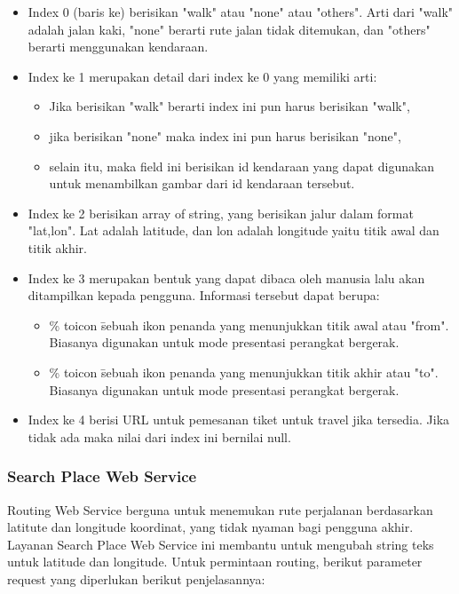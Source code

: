 \begin{itemize}
	\item Index 0 (baris ke) berisikan "walk" atau "none" atau "others". Arti dari "walk" adalah jalan kaki, "none" berarti rute jalan tidak ditemukan, dan "others" berarti menggunakan kendaraan.
	\item Index ke 1 merupakan detail dari index ke 0 yang memiliki arti:
	\begin{itemize}
		\item Jika berisikan "walk" berarti index ini pun harus berisikan "walk",
		\item jika berisikan "none" maka index ini pun harus berisikan "none",
		\item selain itu, maka field ini berisikan id kendaraan yang dapat digunakan untuk menambilkan gambar dari id kendaraan tersebut.
	\end{itemize}
	\item Index ke 2 berisikan array of string, yang berisikan jalur dalam format "lat,lon". Lat adalah latitude, dan lon adalah longitude yaitu titik awal dan titik akhir.
	\item Index ke 3 merupakan bentuk yang dapat dibaca oleh manusia lalu akan ditampilkan kepada pengguna. Informasi tersebut dapat berupa:
	\begin{itemize}
		\item \% toicon \= sebuah ikon penanda yang menunjukkan titik awal atau "from". Biasanya digunakan untuk mode presentasi perangkat bergerak.
		\item \% toicon \= sebuah ikon penanda yang menunjukkan titik akhir atau "to". Biasanya digunakan untuk mode presentasi perangkat bergerak.
	\end{itemize}
	\item Index ke 4 berisi URL untuk pemesanan tiket untuk travel jika tersedia. Jika tidak ada maka nilai dari index ini bernilai null.
\end{itemize}


\subsubsection{Search Place Web Service}
Routing Web Service berguna untuk menemukan rute perjalanan berdasarkan latitute dan longitude koordinat, yang tidak nyaman bagi pengguna akhir. Layanan Search Place Web Service ini membantu untuk mengubah string teks untuk latitude dan longitude. Untuk permintaan routing, berikut parameter request yang diperlukan berikut penjelasannya:

